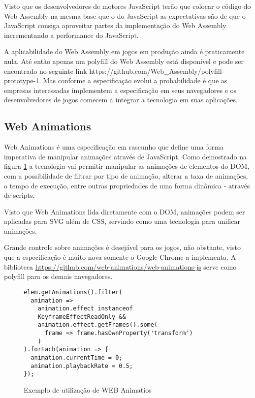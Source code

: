 Visto que os desenvolvedores de motores JavaScript terão que colocar
o código do Web Assembly na mesma base que o do JavaScript as
expectativas são de que o JavaScript consiga aproveitar partes
da implementação do Web Assembly incrementando a performance do
JavaScript.

A aplicabilidade do Web Assembly em jogos em produção ainda
é praticamente nula. Até então apenas um polyfill do Web
Assembly está disponível e pode ser encontrado no seguinte link
https://github.com/Web\_Assembly/polyfill-prototype-1. Mas conforme a
especificação evolui a probabilidade é que as empresas interessadas
implementem a especificação em seus navegadores e os desenvolvedores
de jogos comecem a integrar a tecnologia em suas aplicações.

\subsection{Web Animations}

Web Animations é uma especificação em rascunho que define uma forma
imperativa de manipular animações através de JavaScript. Como
demostrado na figura \ref{fig:webAnimations} a tecnologia vai permitir
manipular as animações de elementos do DOM, com a possibilidade de
filtrar por tipo de animação, alterar a taxa de animações, o tempo
de execução, entre outras propriedades de uma forma dinâmica -
através de scripts.

Visto que Web Animations lida diretamente com o DOM, animações podem
ser aplicadas para SVG além de CSS, servindo como uma tecnologia para
unificar animações.

Grande controle sobre animações é desejável para os
jogos, não obstante, visto que a especificação é muito
nova somente o Google Chrome a implementa. A biblioteca
\url{https://github.com/web-animations/web-animations-js} serve como
polyfill para os demais navegadores.

\begin{figure}[H]
    \centering
    \begin{verbatim}
elem.getAnimations().filter(
  animation =>
    animation.effect instanceof 
    KeyframeEffectReadOnly &&
    animation.effect.getFrames().some(
      frame => frame.hasOwnProperty('transform')
    )
).forEach(animation => {
  animation.currentTime = 0;
  animation.playbackRate = 0.5;
});
    \end{verbatim}
	\caption{Exemplo de utilização de WEB Animatios}
    \label{fig:webAnimations}
\end{figure}

